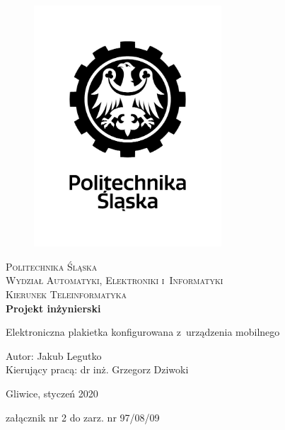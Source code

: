 \documentclass[a4paper,12pt, twoside]{article}
\begin{document}
    	\newpage
    	\thispagestyle{empty}
    	\begin{center}
    		
    		\begin{figure}
    			\centering
    			\includegraphics[width=7cm]{images/polsl_logo.jpg}
    			\vspace{.5cm}
    		\end{figure}
    		
    		{\fontsize{17}{17}\selectfont
    			\textsc{Politechnika Śląska \\[.3cm]
    				Wydział Automatyki, Elektroniki i~Informatyki  \\[.3cm]
    				Kierunek Teleinformatyka  \\[1.5cm]}
    			\textbf{Projekt inżynierski \\[0.7cm]}}
    		
    		\Large
    		{Elektroniczna plakietka konfigurowana z~urządzenia mobilnego \\[3.5cm]}
    		\Large{\begin{flushleft}
    				Autor: Jakub Legutko\\
    				Kierujący pracą: dr inż. Grzegorz Dziwoki\\[0.3cm]
    		\end{flushleft}}
    		
    		\normalsize
    		\vfill Gliwice, styczeń 2020
    	\end{center}
    	\newpage
    	\leavevmode\thispagestyle{empty}\newpage
    	\newpage
    	\begin{flushright}
	        załącznik nr 2 do zarz. nr 97/08/09 
        \end{flushright}
\end{document}
